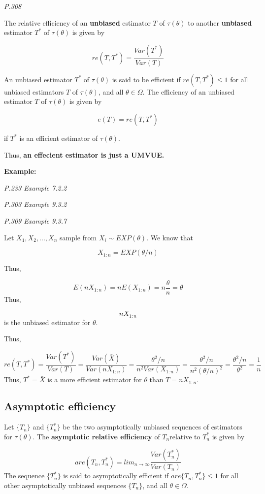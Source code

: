 \documentclass[]{book}
\begin{document}
\emph{P.308}

The relative efficiency of an \textbf{unbiased} estimator \(T\) of \(\tau(\theta)\) to another \textbf{unbiased} estimator \(T^*\) of \(\tau(\theta)\) is given by

\[re(T, T^*)=\frac{Var(T^*)}{Var(T)}\]

An unbiased estimator \(T^*\) of \(\tau(\theta)\) is said to be efficient if \(re(T, T^*) \leq 1\) for all unbiased estimators \(T\) of \(\tau(\theta)\), and all \(\theta \in \Omega\). The efficiency of an unbiased estimator \(T\) of \(\tau(\theta)\) is given by

\[e(T)=re(T, T^*)\]

if \(T^*\) is an efficient estimator of \(\tau(\theta)\).

Thus, \textbf{an effecient estimator is just a UMVUE.}

\textbf{Example:}

\emph{P.233 Example 7.2.2}

\emph{P.303 Example 9.3.2}

\emph{P.309 Example 9.3.7}

Let \(X_1,X_2,...,X_n\) sample from \(X_i \sim EXP(\theta)\). We know that

\[X_{1:n}=EXP(\theta/n)\]

Thus,

\[E(nX_{1:n})=nE(X_{1:n})=n\frac{\theta}{n}=\theta\]
Thus,

\[nX_{1:n}\]
is the unbiased estimator for \(\theta\).

Thus,

\[re(T,T^*)=\frac{Var(T^*)}{Var(T)}=\frac{Var(\bar{X})}{Var(nX_{1:n})}=\frac{\theta^2/n}{n^2Var(X_{1:n})}=\frac{\theta^2/n}{n^2(\theta/n)^2}=\frac{\theta^2/n}{\theta^2}=\frac{1}{n}\]
Thus, \(T^*=\bar{X}\) is a more efficient estimator for \(\theta\) than \(T=nX_{1:n}\).

\hypertarget{asymptotic-efficiency}{%
\subsection{Asymptotic efficiency}\label{asymptotic-efficiency}}

Let \(\{T_n\}\) and \(\{T_n^*\}\) be the two asymptotically unbiased sequences of estimators for \(\tau(\theta)\). The \textbf{asymptotic relative efficiency} of \(T_n\)relative to \(T_n^*\) is given by

\[are(T_n,T_n^*)=lim_{n \rightarrow \infty} \frac{Var(T_n^*)}{Var(T_n)}\]
The sequence \(\{T_n^*\}\) is said to asymptotically efficient if \(are\{T_n, T_n^*\} \leq 1\) for all other asymptotically unbiased sequences \(\{T_n\}\), and all \(\theta \in \Omega\).
\end{document}
